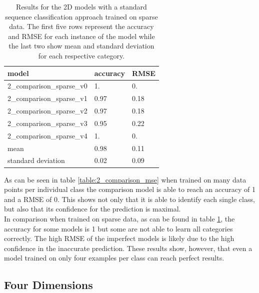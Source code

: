 \begin{table}[!htb]
	\centering
	\caption{Results for the 2D models with a standard sequence classification approach trained on sparse data. The first five rows represent the accuracy and RMSE for each instance of the model while the last two show mean and standard deviation for each respective category.}
	\begin{tabularx}{\textwidth}{ X  X  X }
		\hline
		model & accuracy & RMSE \\ 
		\hline
		2\_comparison\_sparse\_v0 & 1.   & 0.  \\ 
		2\_comparison\_sparse\_v1 & 0.97 & 0.18 \\
		2\_comparison\_sparse\_v2 & 0.97 & 0.18 \\ 
		2\_comparison\_sparse\_v3 & 0.95 & 0.22 \\ 
		2\_comparison\_sparse\_v4 & 1.   & 0.   \\ \hline
		mean & 0.98 & 0.11\\
		standard deviation & 0.02 & 0.09\\
		\hline
	\end{tabularx}
	\label{table:2_comparison_sparse}
\end{table}

As can be seen in table \ref{table:2_comparison_mse} when trained on many data points per individual class the comparison model is able to reach an accuracy of 1 and a RMSE of 0. This shows not only that it is able to identify each single class, but also that its confidence for the prediction is maximal. \\
In comparison when trained on sparse data, as can be found in table \ref{table:2_comparison_sparse}, the accuracy for some models is 1 but some are not able to learn all categories correctly. The high RMSE of the imperfect models is likely due to the high confidence in the inaccurate prediction. These results show, however, that even a model trained on only four examples per class can reach perfect results. 

\subsection{Four Dimensions}

